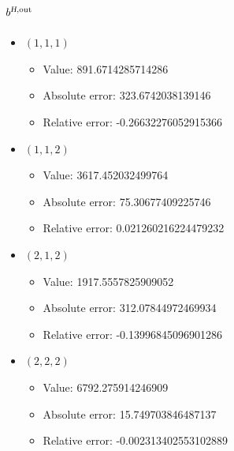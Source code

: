 \documentclass{article}%
\begin{document}
\subsection{$b^{\textsl{H},\text{out}}$}%
\begin{itemize}%
	\item $(1, 1, 1)$%
	\begin{itemize}%
		\item Value: 891.6714285714286%
		\item Absolute error: 323.6742038139146%
		\item Relative error: -0.26632276052915366%
	\end{itemize}%
	\item $(1, 1, 2)$%
	\begin{itemize}%
		\item Value: 3617.452032499764%
		\item Absolute error: 75.30677409225746%
		\item Relative error: 0.021260216224479232%
	\end{itemize}%
	\item $(2, 1, 2)$%
	\begin{itemize}%
		\item Value: 1917.5557825909052%
		\item Absolute error: 312.07844972469934%
		\item Relative error: -0.13996845096901286%
	\end{itemize}%
	\item $(2, 2, 2)$%
	\begin{itemize}%
		\item Value: 6792.275914246909%
		\item Absolute error: 15.749703846487137%
		\item Relative error: -0.002313402553102889%
	\end{itemize}%
\end{itemize}%
\end{document}
